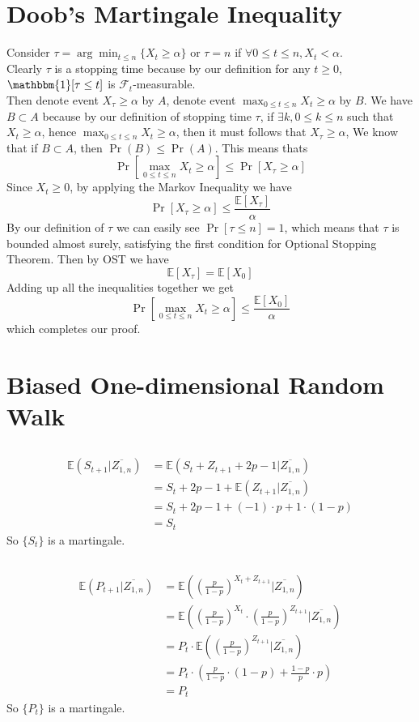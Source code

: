 \documentclass[12pt,letterpaper]{article}
\begin{document}
\section{Doob's Martingale Inequality}
Consider $\tau=\arg\min_{t\leq n}\{X_t\geq\alpha\}$ or $\tau=n$ if $\forall 0\leq t\leq n, X_t<\alpha$.\\
Clearly $\tau$ is a stopping time because by our definition 
for any $t\geq 0$, $\mathbbm{1}[\tau\leq t]$ is $\mathcal{F}_t$-measurable.\\
Then denote event $X_{\tau}\geq\alpha$ by $A$,
denote event $\max_{0\leq t\leq n}X_t\geq\alpha$ by $B$.
We have $B\subset A$ because by our definition of stopping time $\tau$,
if $\exists k, 0\leq k\leq n$ such that $X_t\geq\alpha$,
hence $\max_{0\leq t\leq n}X_t\geq\alpha$,
then it must follows that $X_{\tau}\geq\alpha$,
We know that if $B\subset A$, then $\Pr(B)\leq\Pr(A)$.
This means thats
$$\Pr \left[\max_{0\leq t\leq n}X_t\geq\alpha\right]\leq \Pr\left[X_{\tau}\geq\alpha\right]$$
Since $X_t\geq 0$, by applying the Markov Inequality we have
$$\Pr\left[X_{\tau}\geq\alpha\right]\leq \frac{\mathbb{E}\left[X_{\tau}\right]}{\alpha}$$
By our definition of $\tau$ we can easily see $\Pr[\tau\leq n]=1$,
which means that $\tau$ is bounded almost surely,
satisfying the first condition for Optional Stopping Theorem.
Then by OST we have
$$\mathbb{E}[X_{\tau}]=\mathbb{E}[{X_0}]$$
Adding up all the inequalities together we get 
$$\Pr \left[\max_{0\leq t\leq n}X_t\geq\alpha\right]\leq \frac{\mathbb{E}\left[X_{0}\right]}{\alpha}$$
which completes our proof.

\section{Biased One-dimensional Random Walk}
\subsection{}
\begin{align}
  \mathbb{E}(S_{t+1}|\overline{Z_{1,n}})
  &=\mathbb{E}(S_t+Z_{t+1}+2p-1|\overline{Z_{1,n}})\\
  &=S_t+2p-1+\mathbb{E}(Z_{t+1}|\overline{Z_{1,n}})\\
  &=S_t+2p-1+(-1)\cdot p+1\cdot(1-p)\\
  &=S_t
\end{align}
So $\{S_t\}$ is a martingale.
\subsection{}
\begin{align}
  \mathbb{E}(P_{t+1}|\overline{Z_{1,n}})
  &=\mathbb{E}((\frac{p}{1-p})^{X_t+Z_{t+1}}|\overline{Z_{1,n}})\\
  &=\mathbb{E}((\frac{p}{1-p})^{X_t}\cdot(\frac{p}{1-p})^{Z_{t+1}}|\overline{Z_{1,n}})\\
  &=P_t\cdot\mathbb{E}((\frac{p}{1-p})^{Z_{t+1}}|\overline{Z_{1,n}})\\
  &=P_t\cdot(\frac{p}{1-p}\cdot(1-p)+\frac{1-p}{p}\cdot p)\\
  &=P_t
\end{align}
So $\{P_t\}$ is a martingale.
\end{document}
